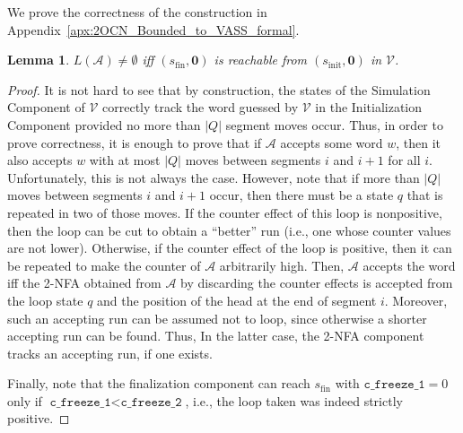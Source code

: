 \documentclass[11pt,a4paper]{amsart}
\newtheorem{lemma}[theorem]{Lemma}
\theoremstyle{definition}
\renewcommand{\vec}[1]{\boldsymbol{#1}}
\newcommand{\vf}[1]{\texttt{#1}}
\newcommand{\cA}{\mathcal{A}}
\newcommand{\cV}{\mathcal{V}}
\begin{document}
We prove the correctness of the construction in Appendix~\ref{apx:2OCN_Bounded_to_VASS_formal}.
\begin{lemma}
\label{lem:correctness_Bounded_2OCN_to_VASS} $L(\cA)\neq \emptyset$ iff
$(s_{\textrm{fin}},\vec{0})$ is reachable from $(s_{\textrm{init}},\vec{0})$
in $\cV$.
\end{lemma}
\begin{proof}
It is not hard to see that by construction, the states of the Simulation
Component of $\cV$ correctly track the word guessed by $\cV$ in the
Initialization Component provided no more than $|Q|$ segment moves occur.
Thus, in order to prove correctness, it is enough to prove that if $\cA$
accepts some word $w$, then it also accepts $w$ with at most $|Q|$ moves
between segments $i$ and $i+1$ for all $i$.  Unfortunately, this is not
always the case.  However, note that if more than $|Q|$ moves between
segments $i$ and $i+1$ occur, then there must be a state $q$ that is
repeated in two of those moves. If the counter effect of this loop is
nonpositive, then the loop can be cut to obtain a ``better'' run (i.e., one
whose counter values are not lower).  Otherwise, if the counter effect of
the loop is positive, then it can be repeated to make the counter of $\cA$
arbitrarily high.  Then, $\cA$ accepts the word iff the 2-NFA obtained from
$\cA$ by discarding the counter effects is accepted from the loop state $q$
and the position of the head at the end of segment $i$. Moreover, such an
accepting run can be assumed not to loop, since otherwise a shorter
accepting run can be found.  Thus, In the latter case, the 2-NFA component
tracks an accepting run, if one exists.

Finally, note that the finalization component can reach $s_{\textrm{fin}}$
with $\vf{c\_freeze\_1}=0$ only if $\vf{c\_freeze\_1}<\vf{c\_freeze\_2}$,
i.e., the loop taken was indeed strictly positive.
\end{proof}

\end{document}
